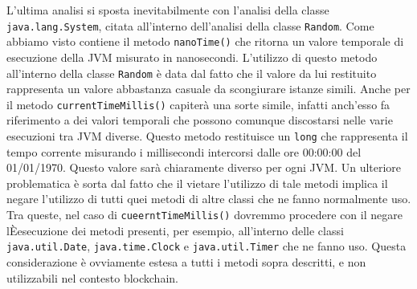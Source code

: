 L'ultima analisi si sposta inevitabilmente con l'analisi della classe \lstinline|java.lang.System|, citata all'interno dell'analisi della classe \lstinline|Random|. Come abbiamo visto contiene il metodo \lstinline|nanoTime()| che ritorna un valore temporale di esecuzione della JVM misurato in nanosecondi. L'utilizzo di questo metodo all'interno della classe \lstinline|Random| è data dal fatto che il valore da lui restituito rappresenta un valore abbastanza casuale da scongiurare istanze simili. Anche per il metodo \lstinline|currentTimeMillis()| capiterà una sorte simile, infatti anch'esso fa riferimento a dei valori temporali che possono comunque discostarsi nelle varie esecuzioni tra JVM diverse. Questo metodo restituisce un \lstinline|long| che rappresenta il tempo corrente misurando i millisecondi intercorsi dalle ore 00:00:00 del 01/01/1970. Questo valore sarà chiaramente diverso per ogni JVM. Un ulteriore problematica è sorta dal fatto che il vietare l'utilizzo di tale metodi implica il negare l'utilizzo di tutti quei metodi di altre classi che ne fanno normalmente uso. Tra queste, nel caso di \lstinline|cueerntTimeMillis()| dovremmo procedere con il negare l\`Eesecuzione dei metodi presenti, per esempio, all'interno delle classi \lstinline|java.util.Date|, \lstinline|java.time.Clock| e \lstinline|java.util.Timer| che ne fanno uso. Questa considerazione è ovviamente estesa a tutti i metodi sopra descritti, e non utilizzabili nel contesto blockchain.